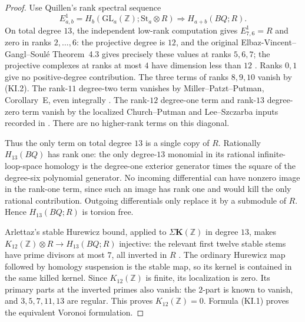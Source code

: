 \begin{proof}
Use Quillen's rank spectral sequence
\[
 E^1_{a,b}
 =H_b(\mathrm{GL}_a(\mathbb Z);\mathrm{St}_a\otimes R)
 \Longrightarrow H_{a+b}(BQ;R).
\]
On total degree $13$, the independent low-rank computation gives
$E^1_{7,6}=R$ and zero in ranks $2,\ldots,6$:
the projective degree is $12$, and the original
Elbaz-Vincent--Gangl--Soul\'e Theorem~4.3 gives precisely these values
at ranks $5,6,7$; the projective complexes at ranks at most $4$
have dimension less than $12$
\cite[Theorem~4.3, p.~597; \S3.4]{ElbazGanglSoule2013}.
Ranks $0,1$ give no positive-degree contribution.
The three terms of ranks $8,9,10$ vanish by (KI.2).
The rank-$11$ degree-two term vanishes by
Miller--Patzt--Putman, Corollary~E, even integrally
\cite[Corollary~E, p.~7]{MillerPatztPutman2025}.
The rank-$12$ degree-one term and rank-$13$ degree-zero term
vanish by the localized Church--Putman and Lee--Szczarba inputs
recorded in \cite[Lemmas~2.1--2.2]{Kupers2019}.
There are no higher-rank terms on this diagonal.

Thus the only term on total degree $13$ is a single copy of $R$.
Rationally $H_{13}(BQ)$ has rank one: the only degree-$13$ monomial
in its rational infinite-loop-space homology is the degree-one
exterior generator times the square of the degree-six polynomial
generator.  No incoming differential can have nonzero image in the
rank-one term, since such an image has rank one and would kill the
only rational contribution.  Outgoing differentials only replace it
by a submodule of $R$.  Hence $H_{13}(BQ;R)$ is torsion free.

Arlettaz's stable Hurewicz bound, applied to
$\Sigma\mathbf K(\mathbb Z)$ in degree $13$, makes
$K_{12}(\mathbb Z)\otimes R\to H_{13}(BQ;R)$ injective:
the relevant first twelve stable stems have prime divisors at most
$7$, all inverted in $R$
\cite[Definition~6.5 and Theorem~6.6, pp.~40--42]{Arlettaz2000}.
The ordinary Hurewicz map followed by homology suspension is the
stable map, so its kernel is contained in the same killed kernel.
Since $K_{12}(\mathbb Z)$ is finite, its localization is zero.
Its primary parts at the inverted primes also vanish: the $2$-part
is known to vanish, and $3,5,7,11,13$ are regular.
This proves $K_{12}(\mathbb Z)=0$.  Formula (KI.1) proves the
equivalent Voronoi formulation.
\end{proof}

